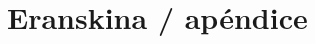 \documentclass[a4page, 11pt, showtrims]{memoir}
\begin{document}

\backmatter
\appendix

\chapter{Eranskina / apéndice} \label{ch:eranskina}




\end{document}
